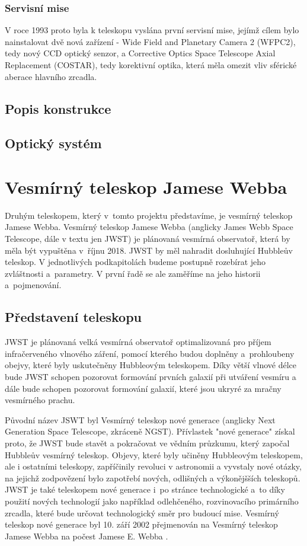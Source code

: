 \documentclass[a4paper,11pt]{article}
\begin{document}
\subsubsection{Servisní mise}
V roce 1993 proto byla k teleskopu vyslána první servisní mise, jejímž cílem bylo nainstalovat dvě nová zařízení - Wide Field and Planetary Camera 2 (WFPC2), tedy nový CCD optický senzor, a Corrective Optics Space Telescope Axial Replacement (COSTAR), tedy korektivní optika, která měla omezit vliv sférické aberace hlavního zrcadla.

\subsection{Popis konstrukce}
\subsection{Optický systém}



\section{Vesmírný teleskop Jamese Webba}

Druhým teleskopem, který v~tomto projektu představíme, je vesmírný teleskop Jamese Webba. Vesmírný teleskop Jamese Webba (anglicky James Webb Space Telescope, dále v textu jen JWST) je plánovaná vesmírná observatoř, která by měla být vypuštěna v~říjnu 2018. JWST by měl nahradit dosluhující Hubbleův teleskop. V jednotlivých podkapitolách budeme postupně rozebírat jeho zvláštnosti a~parametry. V první řadě se ale zaměříme na jeho historii a~pojmenování.

\subsection{Představení teleskopu} 
JWST je plánovaná velká vesmírná observatoř optimalizovaná pro příjem infračerveného vlnového záření, pomocí kterého budou doplněny a~prohloubeny obejvy, které byly uskutečněny Hubbleovým teleskopem.
Díky větší vlnové délce bude JWST schopen pozorovat formování prvních galaxií při utváření vesmíru a dále bude schopen pozorovat formování galaxií, které jsou ukryré za mračny vesmírného prachu.

Původní název JSWT byl Vesmírný teleskop nové generace (anglicky Next Generation Space Telescope, zkráceně NGST). Přívlastek "nové generace" získal proto, že JWST bude stavět a pokračovat ve vědním průzku\-mu, který započal Hubbleův vesmírný teleskop. Objevy, které byly učiněny Hubbleovým teleskopem, ale i ostatními teleskopy, zapříčinily revoluci v astronomii a vyvstaly nové otázky, na jejichž zodpovězení bylo zapotřebí nových, odlišných a výkonějšších teleskopů. 
JWST je také teleskopem nové generace i~po stránce technologické a~to díky použití nových technologií jako například odlehčeného, rozvinovacího primárního zrcadla, které bude určovat technologický směr pro budoucí mise.
Vesmírný teleskop nové generace byl 10. září 2002 přejmenován na Vesmírný teleskop Jamese Webba na počest Jamese E. Webba \cite{nasaFAQ}.
 
\end{document}
